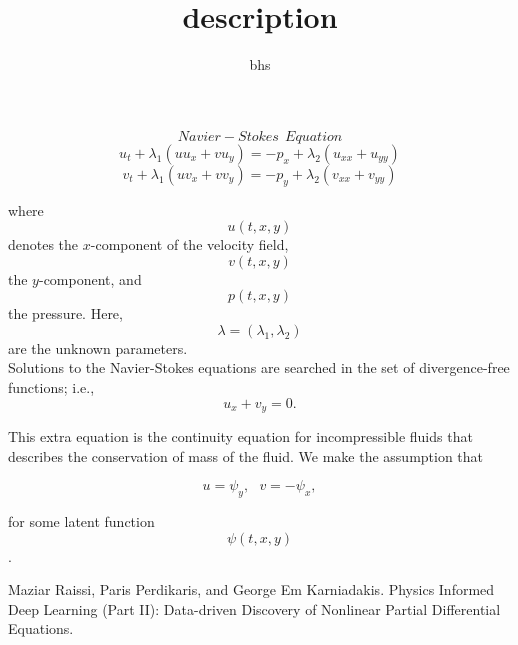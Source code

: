 \documentclass[12pt]{amsart}
\title{description}
\author{bhs}
\begin{document}
\maketitle


$$Navier-Stokes \ \ Equation$$
$$ u_t + \lambda_1 (u u_x + v u_y) = -p_x + \lambda_2 (u_{xx} + u_{yy})$$
$$ v_t + \lambda_1 (u v_x + v v_y) = -p_y + \lambda_2 (v_{xx} + v_{yy})$$

where $$u(t, x, y)$$ denotes the $x$-component of the velocity field, $$v(t, x, y)$$ the $y$-component, and $$p(t, x, y)$$ the pressure.
Here, $$\lambda = (\lambda_1, \lambda_2)$$ are the unknown parameters.\\
Solutions to the Navier-Stokes equations are searched in the set of divergence-free functions; i.e.,
$$ u_x + v_y = 0. $$

This extra equation is the continuity equation for incompressible fluids that describes the conservation of mass of the fluid. We make the assumption that

$$ u = \psi_y,\ \ \ v = -\psi_x, $$

for some latent function $$\psi(t,x,y)$$.





\begin{thebibliography}{10}
 Maziar Raissi, Paris Perdikaris, and George Em Karniadakis. Physics Informed Deep Learning (Part II): Data-driven Discovery of Nonlinear Partial Differential Equations.
\end{thebibliography}
\end{document}
